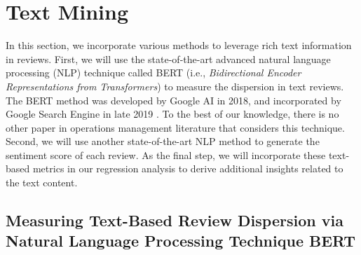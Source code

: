 \documentclass[msom,blindrev]{informs3}
\begin{document}
\section{Text Mining}\label{Sec: TextMining}

In this section, we incorporate various methods to leverage rich text information in reviews.  First, we will use the state-of-the-art advanced natural language processing (NLP) technique called BERT (i.e., \textit{Bidirectional Encoder Representations from Transformers}) to measure the dispersion in text reviews. The BERT method was developed by Google AI in 2018, and incorporated by  Google Search Engine in late 2019 \citep{devlin2018bert,BERT}. To the best of our knowledge, there is no other paper in operations management literature that considers this technique. Second, we will use another state-of-the-art NLP method to generate the sentiment score of each review. As the final step, we will incorporate these text-based metrics in our regression analysis to derive additional insights related to the text content.

\subsection{Measuring Text-Based Review Dispersion via Natural Language Processing Technique BERT} \label{Subsec: Define Txt Ent}
\end{document}

